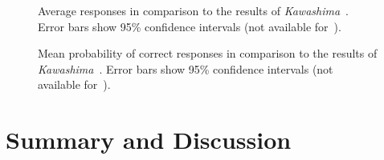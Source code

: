 \begin{figure}[t!]
    \centering
    \begin{adjustbox}{width=0.7\columnwidth}
      
    \end{adjustbox}
    \caption{Average responses in comparison to the results of \emph{Kawashima}~\cite{kawashima15}. Error bars show 95\% confidence intervals (not available for~\cite{kawashima15}).}%
    \label{fig:experiment}
 \end{figure}

\begin{figure}[t!]
   \centering
   \begin{adjustbox}{width=0.7\columnwidth}
     
   \end{adjustbox}
   \caption{Mean probability of correct responses in comparison to the results of \emph{Kawashima}~\cite{kawashima15}. Error bars show 95\% confidence intervals (not available for~\cite{kawashima15}).}%
   \label{fig:experiment}
\end{figure}


\section{Summary and Discussion}

